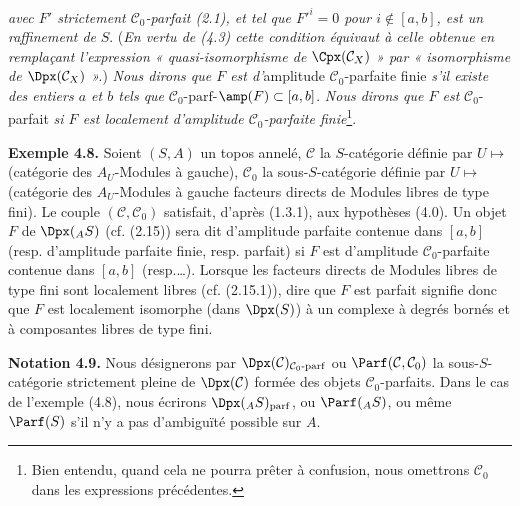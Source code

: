 \emph{avec \(F'\) strictement \(\mathcal C_0\)-parfait (2.1), et tel que \(F'^i=0\) pour \(i\notin[a,b]\), est un raffinement de} \(S\). (\emph{En vertu de (4.3) cette condition équivaut à celle obtenue en remplaçant l'expression « quasi-isomorphisme de \(\Cpx(\mathcal C_X)\) » par « isomorphisme de \(\Dpx(\mathcal C_X)\) ».}) \emph{Nous dirons que \(F\) est d'}amplitude \(\mathcal C_0\)-parfaite finie \emph{s'il existe des entiers \(a\) et \(b\) tels que} \(\mathcal C_0\)-\(\mathrm{parf}\)-\(\amp(F)\subset[a,b]\). \emph{Nous dirons que \(F\) est} \(\mathcal C_0\)-parfait \emph{si \(F\) est localement d'amplitude \(\mathcal C_0\)-parfaite finie}\footnote{Bien entendu, quand cela ne pourra prêter à confusion, nous omettrons \(\mathcal C_0\) dans les expressions précédentes.}.

\textbf{Exemple 4.8.} Soient \((S,A)\) un topos annelé, \(\mathcal C\) la \(S\)-catégorie définie par \(U\longmapsto\) (catégorie des \(A_U\)-Modules à gauche), \(\mathcal C_0\) la sous-\(S\)-catégorie définie par \(U\longmapsto\) (catégorie des \(A_U\)-Modules à gauche facteurs directs de Modules libres de type fini). Le couple \((\mathcal C,\mathcal C_0)\) satisfait, d'après (1.3.1), aux hypothèses (4.0). Un objet \(F\) de \(\Dpx(_A S)\) (cf. (2.15)) sera dit d'amplitude parfaite contenue dans \([a,b]\) (resp. d'amplitude parfaite finie, resp. parfait) si \(F\) est d'amplitude \(\mathcal C_0\)-parfaite contenue dans \([a,b]\) (resp.\dots). Lorsque les facteurs directs de Modules libres de type fini sont localement libres (cf. (2.15.1)), dire que \(F\) est parfait signifie donc que \(F\) est localement isomorphe (dans \(\Dpx(S)\)) à un complexe à degrés bornés et à composantes libres de type fini.

\textbf{Notation 4.9.} Nous désignerons par \(\Dpx(\mathcal C)_{\mathcal C_0\text{-}\mathrm{parf}}\) ou \(\Parf(\mathcal C,\mathcal C_0)\) la sous-\(S\)-catégorie strictement pleine de \(\Dpx(\mathcal C)\) formée des objets \(\mathcal C_0\)-parfaits. Dans le cas de l'exemple (4.8), nous écrirons \(\Dpx(_A S)_{\mathrm{parf}}\), ou \(\Parf(_A S)\), ou même \(\Parf(S)\) s'il n'y a pas d'ambiguïté possible sur \(A\).


